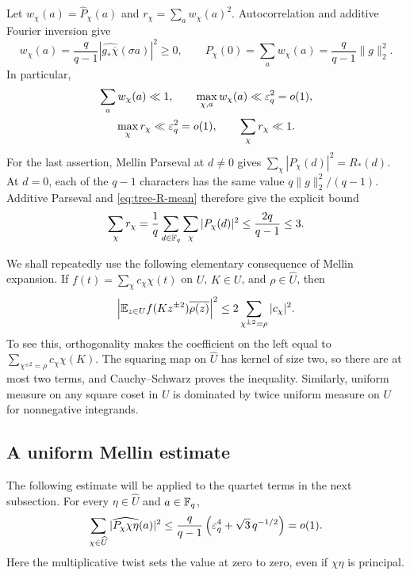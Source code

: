 Let $w_\chi(a)=\widehat P_\chi(a)$ and
$r_\chi=\sum_a w_\chi(a)^2$.  Autocorrelation and additive Fourier
inversion give
\[
 w_\chi(a)=\frac q{q-1}
            |\widehat{g_*\overline\chi}(\sigma a)|^2\geq0,
 \qquad
 P_\chi(0)=\sum_a w_\chi(a)
          =\frac q{q-1}\|g\|_2^2.
\]
In particular,
\begin{equation}\label{eq:src40}
 \begin{gathered}
 \sum_a w_\chi(a)\ll1,\qquad
 \max_{\chi,a}w_\chi(a)\ll\varepsilon_q^2=o(1),\\
 \max_\chi r_\chi\ll\varepsilon_q^2=o(1),\qquad
 \sum_\chi r_\chi\ll1.
 \end{gathered}
\end{equation}
For the last assertion, Mellin Parseval at $d\ne0$ gives
$\sum_\chi|P_\chi(d)|^2=R_*(d)$.  At $d=0$, each of the $q-1$
characters has the same value $q\|g\|_2^2/(q-1)$.  Additive Parseval
and \eqref{eq:tree-R-mean} therefore give the explicit bound
\begin{equation}\label{eq:tree-total-r}
 \sum_\chi r_\chi
 =\frac1q\sum_{d\in\mathbb F_q}\sum_\chi|P_\chi(d)|^2
 \leq\frac{2q}{q-1}\leq3.
\end{equation}

We shall repeatedly use the following elementary consequence of Mellin
expansion.  If $f(t)=\sum_\chi c_\chi\chi(t)$ on $U$, $K\in U$, and
$\rho\in\widehat U$, then
\begin{equation}\label{eq:tree-square-pullback}
 \left|\mathbb E_{z\in U}f(Kz^{\pm2})\overline{\rho(z)}\right|^2
 \leq2\sum_{\chi^{\pm2}=\rho}|c_\chi|^2.
\end{equation}
To see this, orthogonality makes the coefficient on the left equal to
$\sum_{\chi^{\pm2}=\rho}c_\chi\chi(K)$.  The squaring map on
$\widehat U$ has kernel of size two, so there are at most two terms,
and Cauchy--Schwarz proves the inequality.  Similarly, uniform measure
on any square coset in $U$ is dominated by twice uniform measure on
$U$ for nonnegative integrands.

\subsection{A uniform Mellin estimate}

The following estimate will be applied to the quartet terms in the next
subsection.  For every $\eta\in\widehat U$ and $a\in\mathbb F_q$,
\begin{equation}\label{eq:src42}
 \sum_{\chi\in\widehat U}
       |\widehat{P_\chi\chi\eta}(a)|^2
 \leq\frac q{q-1}
       \left(\varepsilon_q^4+\sqrt3\,q^{-1/2}\right)=o(1).
\end{equation}
Here the multiplicative twist sets the value at zero to zero, even if
$\chi\eta$ is principal.

